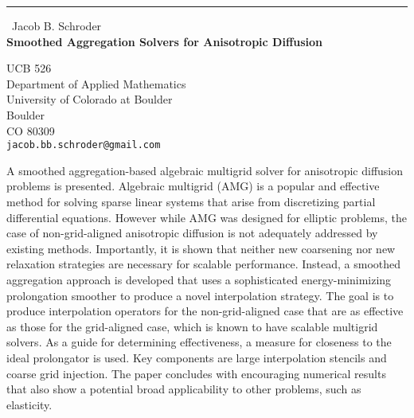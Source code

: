 \documentclass{report}
\begin{document}
\begin{center}
\rule{6in}{1pt} \
{\large Jacob B. Schroder \\
{\bf Smoothed Aggregation Solvers for Anisotropic Diffusion}}

UCB 526 \\ Department of Applied Mathematics \\ University of Colorado at Boulder \\ Boulder \\ CO 80309
\\
{\tt jacob.bb.schroder@gmail.com}\end{center}

A smoothed aggregation-based algebraic multigrid solver for anisotropic
diffusion problems is presented. Algebraic multigrid (AMG) is a popular
and effective method for solving sparse linear systems that arise from
discretizing partial differential equations. However while AMG was
designed for elliptic problems, the case of non-grid-aligned anisotropic
diffusion is not adequately addressed by existing methods. Importantly,
it is shown that neither new coarsening nor new relaxation strategies are
necessary for scalable performance. Instead, a smoothed aggregation
approach is developed that uses a sophisticated energy-minimizing
prolongation smoother to produce a novel interpolation strategy. The goal
is to produce interpolation operators for the non-grid-aligned case that
are as effective as those for the grid-aligned case, which is known to
have scalable multigrid solvers. As a guide for determining
effectiveness, a measure for closeness to the ideal prolongator is used.
Key components are large interpolation stencils and coarse grid
injection. The paper concludes with encouraging numerical results that
also show a potential broad applicability to other problems, such as
elasticity.
\end{document}
